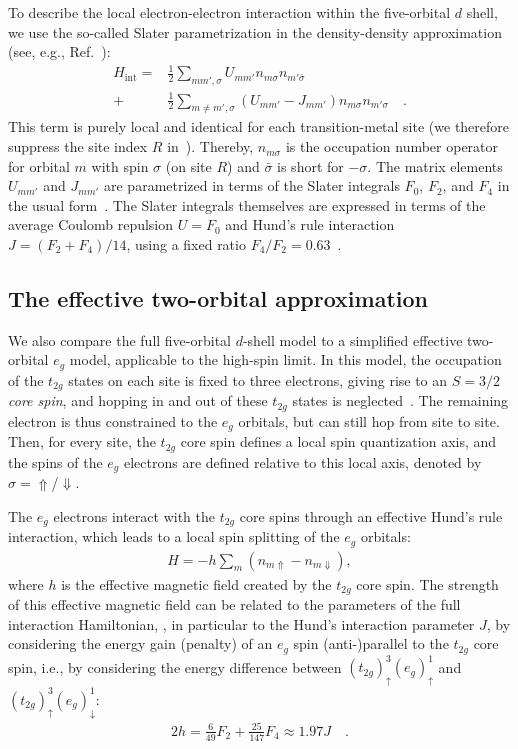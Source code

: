 \documentclass[aps,prb,twocolumn,superscriptaddress,10pt]{revtex4-1}
\newcommand{\pref}[1]{\prettyref{#1}}%
\newcommand{\eg}{\ensuremath{{e_g}}\xspace}
\newcommand{\ttg}{\ensuremath{{t_{2g}}}\xspace}
\begin{document}
To describe the local electron-electron interaction within the five-orbital $d$ shell, we use the so-called Slater parametrization in the density-density approximation (see, e.g., Ref.~):
\begin{align}
\label{eq:hint}
    H_\mathrm{int} = &\frac12 \sum_{mm',\sigma} U_{mm'} n_{m\sigma} n_{m'\bar\sigma} \nonumber\\
    + &\frac12 \sum_{m\neq m',\sigma} (U_{mm'} - J_{mm'}) n_{m\sigma} n_{m'\sigma} \quad .
\end{align}
This term is purely local and identical for each transition-metal site (we therefore suppress the site index $R$ in~\pref{eq:hint}).
Thereby, $n_{m\sigma}$ is the occupation number operator for orbital $m$ with spin $\sigma$ (on site $R$) and $\bar{\sigma}$ is short for $-\sigma$.
The matrix elements $U_{mm'}$ and $J_{mm'}$ are parametrized in terms of the Slater integrals $F_0$, $F_2$, and $F_4$ in the usual form~\cite{pavarini_ldadmft_2011}. The Slater integrals themselves are expressed in terms of the average Coulomb repulsion $U = F_0$ and Hund's rule interaction $J = (F_2 + F_4)/14$, using a fixed ratio $F_4/F_2 = 0.63$~\cite{pavarini_ldadmft_2011}. 

\subsection{The effective two-orbital approximation}
\label{sec:two-orbital}

We also compare the full five-orbital $d$-shell model to a simplified effective two-orbital \eg model, applicable to the high-spin limit. In this model, the occupation of the \ttg states on each site is fixed to three electrons, giving rise to an $S=3/2$ \emph{core spin}, and hopping in and out of these \ttg states is neglected~\cite{ahn_effects_2000,pavarini_origin_2010}. The remaining electron is thus constrained to the $e_g$ orbitals, but can still hop from site to site.
%
Then, for every site, the \ttg core spin defines a local spin quantization axis, and the spins of the \eg  electrons are defined relative to this local axis, denoted by $\sigma=\Uparrow$/$\Downarrow$. 

The $e_g $ electrons interact with the \ttg core spins through an effective Hund's rule interaction, which leads to a local spin splitting of the \eg orbitals:
\begin{align}
    H = -h \sum_m (n_{m\Uparrow} - n_{m\Downarrow}),
\end{align}
where $h$ is the effective magnetic field created by the \ttg core spin. The strength of this effective magnetic field can be related to the parameters of the full interaction Hamiltonian, \pref{eq:hint}, in particular to the Hund's interaction parameter $J$, by considering the energy gain (penalty) of an \eg spin (anti-)parallel to the \ttg core spin, i.e., by considering the energy difference between $(t_{2g})^3_\uparrow (e_g)^1_\uparrow$ and $(t_{2g})^3_\uparrow (e_g)^1_\downarrow$:
\begin{align}
    2h = \frac6{49} F_2 + \frac{25}{147} F_4 \approx 1.97 J \quad .
\end{align}
\end{document}
